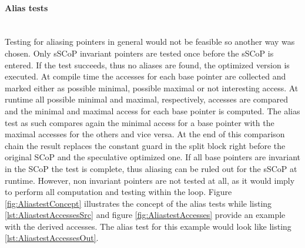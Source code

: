 \begin{shaded}
\paragraph{Alias tests \\} 
~\\

Testing for aliasing pointers in general would not be feasible so another way 
was chosen. Only sSCoP invariant pointers are tested once before the sSCoP is
entered. If the test succeeds, thus no aliases are found, the optimized version
is executed. At compile time the accesses for each base pointer are collected and
marked either as possible minimal, possible maximal or not interesting access. At 
runtime all possible minimal and maximal, respectively, accesses are compared 
and the minimal and maximal access for each base pointer is computed. The alias 
test as such compares again the minimal access for a base pointer with the maximal 
accesses for the others and vice versa. At the end of this comparison chain the 
result replaces the constant guard in the split block right before the original SCoP 
and the speculative optimized one. If all base pointers are invariant in the
SCoP the test is complete, thus aliasing can be ruled out for the sSCoP at
runtime. However, non invariant pointers are not tested at all, as it would 
imply to perform all computation and testing within the loop. 
Figure \ref{fig:AliastestConcept} illustrates the concept of the alias
tests while listing \ref{lst:AliastestAccessesSrc} and figure
\ref{fig:AliastestAccesses} provide an example with the derived accesses. 
The alias test for this example would look like listing
\ref{lst:AliastestAccessesOut}.

\end{shaded}


